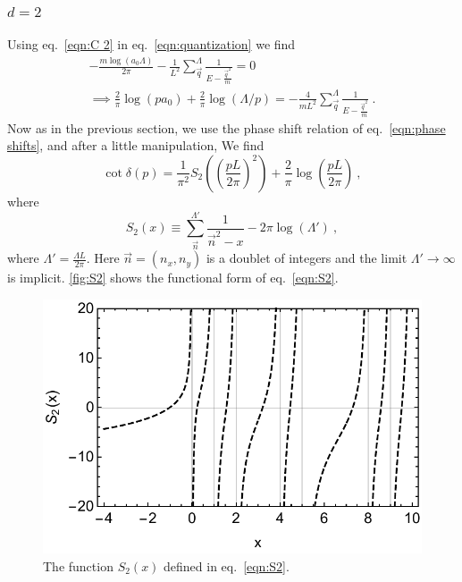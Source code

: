 \documentclass[11pt]{article}
\begin{document}
\subsubsection{$d=2$}
Using eq.~\eqref{eqn:C 2} in eq.~\eqref{eqn:quantization} we find
\begin{multline}
-\frac{m \log (a_0\Lambda)}{2 \pi }-\frac{1}{L^2}\sum_{\vec{q}}^\Lambda \frac { 1 } { E - \frac{\vec{q}^2}{m} }=0\\
\implies
\frac{2}{\pi}\log (pa_0)+\frac{2}{\pi}\log(\Lambda/p)=-\frac{4}{mL^2}\sum_{\vec{q}}^\Lambda \frac { 1 } { E - \frac{\vec{q}^2}{m} }\ .
\end{multline}
Now as in the previous section, we use the phase shift relation of eq.~\eqref{eqn:phase shifts}, and after a little manipulation, We find
\begin{equation}
\cot \delta(p)=\frac{1}{\pi^2}S_2\left(\left(\frac{pL}{2\pi}\right)^2\right)+\frac{2}{\pi}\log\left(\frac{pL}{2\pi}\right)\ ,
\end{equation}
where
\begin{equation}\label{eqn:S2}
S_2(x)\equiv\sum_{\vec{n}}^{\Lambda'} \frac { 1 } { \vec{n}^2 -x}-2\pi\log\left(\Lambda'\right)\ ,
\end{equation}
where $\Lambda'=\frac{\Lambda L}{2\pi}$.
Here $\vec{n}=(n_x,n_y)$ is a doublet of integers and the limit $\Lambda'\to\infty$ is implicit.   \autoref{fig:S2} shows the functional form of eq.~\eqref{eqn:S2}.
\begin{figure}
\center
\includegraphics[width=.8\columnwidth]{figure/S2.pdf}
\caption{The function $S_2(x)$ defined in eq.~\eqref{eqn:S2}.\label{fig:S2}}
\end{figure}
\end{document}
